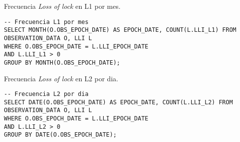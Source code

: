 Frecuencia \emph{Loss of lock} en L1 por mes. \\

\begin{lstlisting}
-- Frecuencia L1 por mes
SELECT MONTH(O.OBS_EPOCH_DATE) AS EPOCH_DATE, COUNT(L.LLI_L1) FROM OBSERVATION_DATA O, LLI L
WHERE O.OBS_EPOCH_DATE = L.LLI_EPOCH_DATE
AND L.LLI_L1 > 0
GROUP BY MONTH(O.OBS_EPOCH_DATE);
\end{lstlisting}

Frecuencia \emph{Loss of lock} en L2 por dia. \\

\begin{lstlisting}
-- Frecuencia L2 por dia
SELECT DATE(O.OBS_EPOCH_DATE) AS EPOCH_DATE, COUNT(L.LLI_L2) FROM OBSERVATION_DATA O, LLI L
WHERE O.OBS_EPOCH_DATE = L.LLI_EPOCH_DATE
AND L.LLI_L2 > 0
GROUP BY DATE(O.OBS_EPOCH_DATE);
\end{lstlisting}